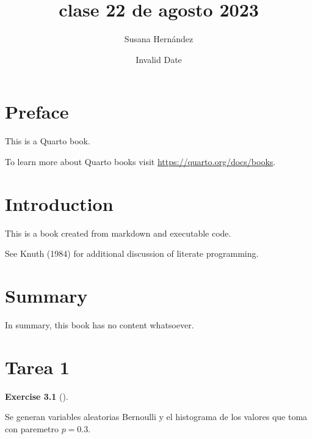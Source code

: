 \documentclass[
  letterpaper,
  DIV=11,
  numbers=noendperiod]{scrreprt}
\title{clase 22 de agosto 2023}
\author{Susana Hernández}
\date{Invalid Date}
\renewcommand*\contentsname{Table of contents}
\newcommand\contentsname{Table of contents}
\theoremstyle{plain}
\theoremstyle{definition}
\newtheorem{exercise}{Exercise}[chapter]
\theoremstyle{remark}
\begin{document}
\maketitle
\ifdefined\Shaded\renewenvironment{Shaded}{\begin{tcolorbox}[enhanced, interior hidden, borderline west={3pt}{0pt}{shadecolor}, sharp corners, breakable, frame hidden, boxrule=0pt]}{\end{tcolorbox}}\fi

\renewcommand*\contentsname{Table of contents}
{
\hypersetup{linkcolor=}
\setcounter{tocdepth}{2}
\tableofcontents
}

\hypertarget{preface}{%
\chapter*{Preface}\label{preface}}


This is a Quarto book.

To learn more about Quarto books visit
\url{https://quarto.org/docs/books}.


\hypertarget{introduction}{%
\chapter{Introduction}\label{introduction}}

This is a book created from markdown and executable code.

See Knuth (1984) for additional discussion of literate programming.


\hypertarget{summary}{%
\chapter{Summary}\label{summary}}

In summary, this book has no content whatsoever.


\hypertarget{tarea-1}{%
\chapter{Tarea 1}\label{tarea-1}}

\begin{exercise}[]\protect\hypertarget{exr-1}{}\label{exr-1}

Se generan variables aleatorias Bernoulli y el histograma de los valores
que toma con paremetro \(p=0.3\).

\end{exercise}
\end{document}
